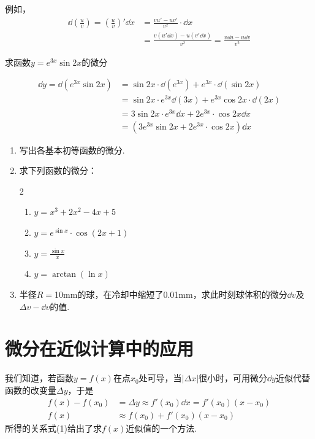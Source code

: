 例如，
\[\begin{split}
    \dd\left(\frac{u}{v}\right)=\left(\frac{u}{v}\right)'\dd x&=\frac{vu'-uv'}{v^2}\cdot \dd x\\
    &=\frac{v(u'\dd x)-u(v'\dd x)}{v^2}=\frac{v\dd u-u\dd v}{v^2}
\end{split}\]

\begin{example}
    求函数$y=e^{3x}\sin 2x$的微分
\end{example}

\begin{solution}
\[\begin{split}
\dd y=\dd (e^{3x}\sin 2x)&=\sin 2x\cdot \dd(e^{3x})+e^{3x}\cdot \dd (\sin2x)\\
&=\sin 2x\cdot e^{3x}\dd (3x)+e^{3x}\cos 2x\cdot \dd(2x)\\
&=3\sin 2x\cdot e^{3x}\dd x+2e^{3x}\cdot \cos2x\dd x\\
&=\left(3e^{3x}\sin2x+2e^{3x}\cdot \cos 2 x\right)\dd x
    \end{split}\]
\end{solution}

\begin{ex}
\begin{enumerate}
    \item 写出各基本初等函数的微分.
    \item 求下列函数的微分：
\begin{multicols}{2}
\begin{enumerate}[(1)]
    \item $y=x^3+2x^2-4x+5$
    \item $y=e^{\sin x}\cdot \cos(2x+1)$
    \item $y=\frac{\sin x}{x}$
    \item $y=\arctan(\ln x)$
\end{enumerate}
\end{multicols}

    \item 半径$R=$10mm的球，在冷却中缩短了0.01mm，求此时刻球体积的微分$\dd v$及$\Delta v-\dd v$的值.
\end{enumerate}
\end{ex}

\section{微分在近似计算中的应用}
我们知道，若函数$y=f(x)$在点$x_0$处可导，当$|\Delta x|$很小时，可用微分$\dd y$近似代替函数的改变量$\Delta y$，于是
\begin{align}
  f(x)-f(x_0)&=\Delta y\approx f'(x_0)\dd x=f'(x_0)(x-x_0)\nonumber\\
f(x)&\approx f(x_0)+f'(x_0)(x-x_0)  \tag{1}
\end{align}
所得的关系式(1)给出了求$f(x)$近似值的一个方法.

